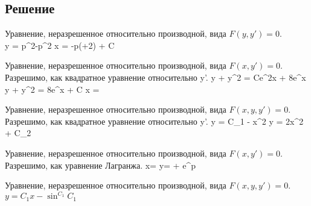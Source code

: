 \subsection{Решение}
\begin{enumerate}
    \solutionItemFirst
        {\equationFirst}
        {
        	Уравнение, неразрешенное относительно производной,
        	вида $ F(y, y') = 0 $. \\
        }
        {
        	\customCases
        		{y = p^2-p^2}
        		{x = -p(+2) + C}
        }

	\clearpage

    \solutionItemFirst
	    {\equationSecond}
	    {
	    	Уравнение, неразрешенное относительно производной,
	    	вида $ F(x, y') = 0 $. \\
	    	Разрешимо, как квадратное уравнение относительно y'.
    	}
	    {
	    	\customCases
				{y + y^2 = Ce^{2x} + 8e^x}
				{ y + y^2 = 8e^x + C}
	    		{x = }
    	}

	\vspace{2em}

	\solutionItemFirst
		{\equationThird}
		{
			Уравнение, неразрешенное относительно производной,
			вида $ F(x, y, y') = 0 $. \\
			Разрешимо, как квадратное уравнение относительно y'.
		}
		{
			\customCases
				{{y} = C_1 - x^2}
				{{y} = 2x^2 + C_2}
		}

	\vspace{2em}

	\solutionItemFirst
		{\equationFourth}
		{
			Уравнение, неразрешенное относительно производной,
			вида $ F(x, y') = 0 $. \\
			Разрешимо, как уравнение Лагранжа.
		}
		{
			\customCases
				{x=}	
				{y= + e^p}
		}

	\clearpage

	\solutionItemFirst
		{\equationFifth}
		{
			Уравнение, неразрешенное относительно производной,
			вида $ F(x, y, y') = 0 $. \\
		}
		{$ y=C_1x-\sin^{C_1}{C_1} $}

\end{enumerate} 

